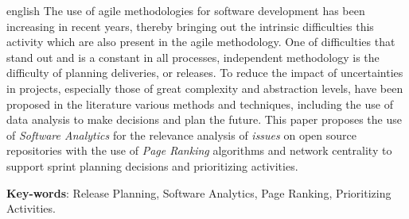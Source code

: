 \begin{resumo}[Abstract]
 \begin{otherlanguage*}{english}
  The use of agile methodologies for software development has been
  increasing in recent years, thereby bringing out the intrinsic difficulties
  this activity which are also present in the agile methodology. One of
  difficulties that stand out and is a constant in all processes, independent
  methodology is the difficulty of planning deliveries, or releases. To reduce the
  impact of uncertainties in projects, especially those of great complexity
  and abstraction levels, have been proposed in the literature various methods and techniques,
  including the use of data analysis to make decisions and plan the future.
  This paper proposes the use of \textit {Software Analytics} for the relevance 
  analysis of \textit{issues} on open source repositories with the use of
  \textit{Page Ranking} algorithms and network centrality to support sprint planning 
  decisions and prioritizing activities.
   \vspace{\onelineskip}
 
   \noindent 
   \textbf{Key-words}: Release Planning, Software Analytics, Page Ranking, Prioritizing Activities.
 \end{otherlanguage*}
\end{resumo}
